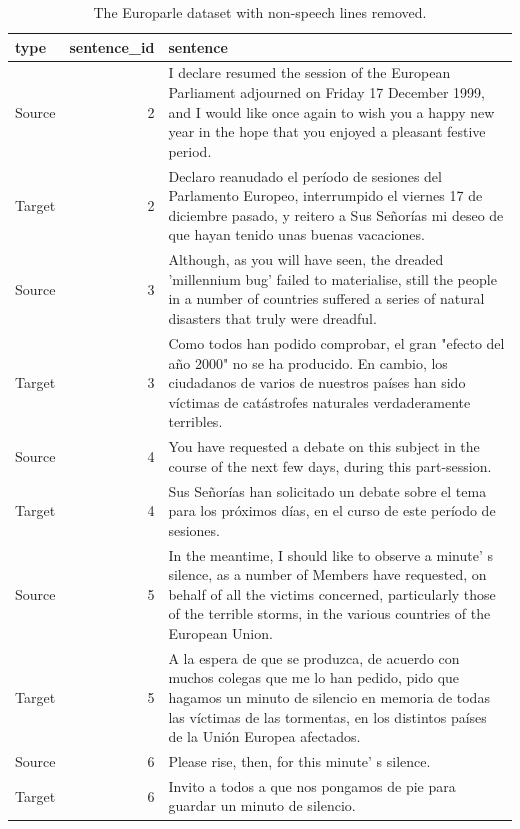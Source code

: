 \documentclass[
  letterpaper,
]{scrbook}
\begin{document}
\hypertarget{tbl-normalize-non-speech-remove-europarle}{}
\begin{table}
\caption{\label{tbl-normalize-non-speech-remove-europarle}The Europarle dataset with non-speech lines removed. }\tabularnewline

\centering
\begin{tabular}{lrl}
\toprule
type & sentence\_id & sentence\\
\midrule
Source & 2 & I declare resumed the session of the European Parliament adjourned on Friday 17 December 1999, and I would like once again to wish you a happy new year in the hope that you enjoyed a pleasant festive period.\\
Target & 2 & Declaro reanudado el período de sesiones del Parlamento Europeo, interrumpido el viernes 17 de diciembre pasado, y reitero a Sus Señorías mi deseo de que hayan tenido unas buenas vacaciones.\\
Source & 3 & Although, as you will have seen, the dreaded 'millennium bug' failed to materialise, still the people in a number of countries suffered a series of natural disasters that truly were dreadful.\\
Target & 3 & Como todos han podido comprobar, el gran "efecto del año 2000" no se ha producido. En cambio, los ciudadanos de varios de nuestros países han sido víctimas de catástrofes naturales verdaderamente terribles.\\
Source & 4 & You have requested a debate on this subject in the course of the next few days, during this part-session.\\
\addlinespace
Target & 4 & Sus Señorías han solicitado un debate sobre el tema para los próximos días, en el curso de este período de sesiones.\\
Source & 5 & In the meantime, I should like to observe a minute' s silence, as a number of Members have requested, on behalf of all the victims concerned, particularly those of the terrible storms, in the various countries of the European Union.\\
Target & 5 & A la espera de que se produzca, de acuerdo con muchos colegas que me lo han pedido, pido que hagamos un minuto de silencio en memoria de todas las víctimas de las tormentas, en los distintos países de la Unión Europea afectados.\\
Source & 6 & Please rise, then, for this minute' s silence.\\
Target & 6 & Invito a todos a que nos pongamos de pie para guardar un minuto de silencio.\\

\end{tabular}
\end{table}
\end{document}
